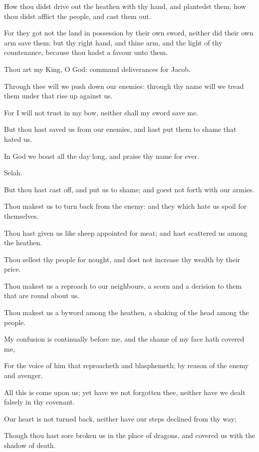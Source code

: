 \verse How thou didst drive out the heathen with thy hand, and plantedst them; how thou didst afflict the people, and cast them out.

\verse For they got not the land in possession by their own sword, neither did their own arm save them: but thy right hand, and thine arm, and the light of thy countenance, because thou hadst a favour unto them.

\verse Thou art my King, O God: command deliverances for Jacob.

\verse Through thee will we push down our enemies: through thy name will we tread them under that rise up against us.

\verse For I will not trust in my bow, neither shall my sword save me.

\verse But thou hast saved us from our enemies, and hast put them to shame that hated us.

\verse In God we boast all the day long, and praise thy name for ever.

Selah.

\verse But thou hast cast off, and put us to shame; and goest not forth with our armies.

\verse Thou makest us to turn back from the enemy: and they which hate us spoil for themselves.

\verse Thou hast given us like sheep appointed for meat; and hast scattered us among the heathen.

\verse Thou sellest thy people for nought, and dost not increase thy wealth by their price.

\verse Thou makest us a reproach to our neighbours, a scorn and a derision to them that are round about us.

\verse Thou makest us a byword among the heathen, a shaking of the head among the people.

\verse My confusion is continually before me, and the shame of my face hath covered me,

\verse For the voice of him that reproacheth and blasphemeth; by reason of the enemy and avenger.

\verse All this is come upon us; yet have we not forgotten thee, neither have we dealt falsely in thy covenant.

\verse Our heart is not turned back, neither have our steps declined from thy way;

\verse Though thou hast sore broken us in the place of dragons, and covered us with the shadow of death.


